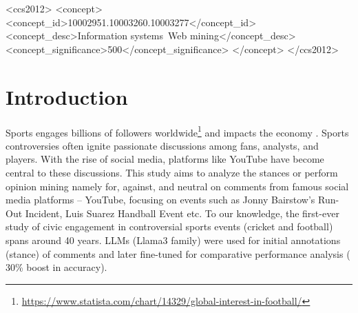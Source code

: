 \documentclass[sigconf, review]{acmart}
\begin{document}
\begin{CCSXML}
<ccs2012>
   <concept>
       <concept_id>10002951.10003260.10003277</concept_id>
       <concept_desc>Information systems~Web mining</concept_desc>
       <concept_significance>500</concept_significance>
       </concept>
 </ccs2012>
\end{CCSXML}



\maketitle

\section{Introduction}


Sports engages billions of followers worldwide\footnote{\url{https://www.statista.com/chart/14329/global-interest-in-football/}} 
and impacts the economy \cite{sportseconomics20221}. Sports controversies often ignite passionate discussions among fans, analysts, and players. With the rise of social media, platforms like YouTube have become central to these discussions. This study aims to analyze the stances or perform opinion mining namely for, against, and neutral on comments from famous social media platforms -- YouTube, focusing on events such as Jonny Bairstow's Run-Out Incident, Luis Suarez Handball Event etc.
To our knowledge, the first-ever study of civic engagement in controversial sports events (cricket and football) spans around 40 years. LLMs (Llama3 family) were used for initial annotations (stance) of comments and later fine-tuned for comparative performance analysis ($~$30\% boost in accuracy).

\end{document}
